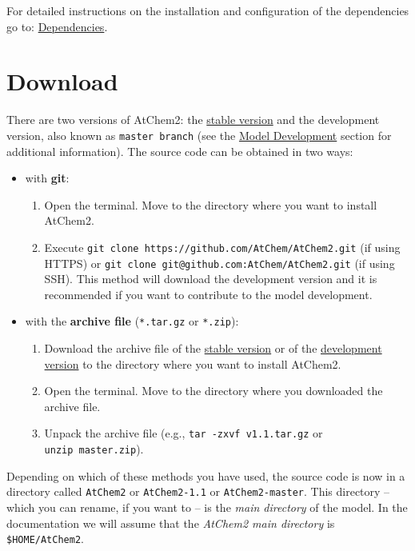 For detailed instructions on the installation and configuration of the
dependencies go to: \hyperref[sec:dependencies]{Dependencies}.

\section{Download} \label{sec:download}

There are two versions of AtChem2: the
\href{https://github.com/AtChem/AtChem2/releases}{stable version} and
the development version, also known as \texttt{master\ branch} (see
the \hyperref[ch:development]{Model Development} section for
additional information). The source code can be obtained in two ways:

\begin{itemize}
\item with \textbf{git}:
  \begin{enumerate}
  \item Open the terminal. Move to the directory where you want to
    install AtChem2.
  \item Execute \texttt{git\ clone\
      https://github.com/AtChem/AtChem2.git} (if using HTTPS) or
    \texttt{git\ clone\ git@github.com:AtChem/AtChem2.git} (if using
    SSH). This method will download the development version and it is
    recommended if you want to contribute to the model development.
  \end{enumerate}
\item with the \textbf{archive file} (\texttt{*.tar.gz} or
  \texttt{*.zip}):
  \begin{enumerate}
  \item Download the archive file of the
    \href{https://github.com/AtChem/AtChem2/releases}{stable version}
    or of the
    \href{https://github.com/AtChem/AtChem2/archive/master.zip}{development
      version} to the directory where you want to install AtChem2.
  \item Open the terminal. Move to the directory where you downloaded
    the archive file.
  \item Unpack the archive file (e.g., \texttt{tar\ -zxvf\
      v1.1.tar.gz} or \texttt{unzip\ master.zip}).
  \end{enumerate}
\end{itemize}

Depending on which of these methods you have used, the source code is
now in a directory called \texttt{AtChem2} or \texttt{AtChem2-1.1} or
\texttt{AtChem2-master}. This directory -- which you can rename, if
you want to -- is the \emph{main directory} of the model. In the
documentation we will assume that the \emph{AtChem2 main directory} is
\texttt{\$HOME/AtChem2}.

